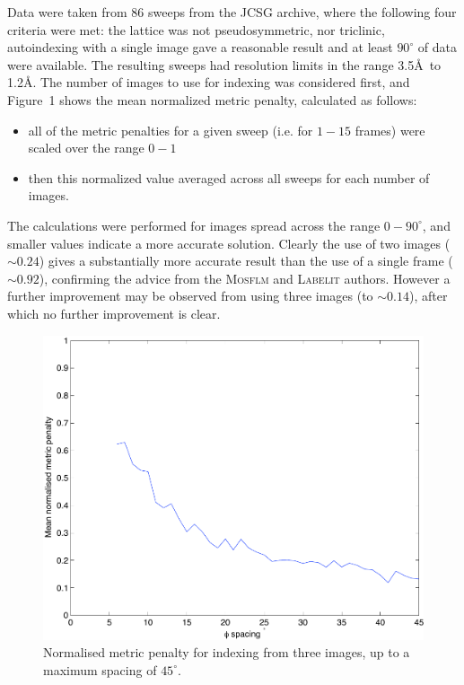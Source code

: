 \documentclass[preprint,pdf]{iucr}
\begin{document}
Data were taken from 86 sweeps from the JCSG archive, where  the
following four
criteria were met: the lattice was not pseudosymmetric, nor triclinic,
autoindexing with a single image gave a reasonable result and
at least $90^{\circ}$ of data were available. The resulting sweeps had 
resolution limits in the range 3.5\AA\ to 1.2\AA. The number of images
to use for indexing was considered first, and Figure~1
shows the mean normalized metric penalty, calculated as follows:

\begin{itemize}
\item{all of the metric penalties for a
  given sweep (i.e. for $1 - 15$ frames) were scaled over the range $0 - 1$}
\item{then this normalized
  value averaged across all sweeps for each number of images.}
\end{itemize}

\noindent
The calculations were performed for
images spread across the range $0 - 90^{\circ}$, and
smaller values indicate a more accurate solution. Clearly the use of
two images ($\sim 0.24$) gives a substantially more accurate result
than the use of a single frame ($\sim 0.92$), 
confirming the advice from the \textsc{Mosflm} and
\textsc{Labelit} authors. However a further improvement may be observed from
using three images (to $\sim 0.14$), after which no further
improvement is clear.  

\begin{figure}
\caption{Normalised metric penalty for indexing from three images, up
  to a maximum spacing of $45^{\circ}$.
\label{figure:phi_spacing_45a}}
\centering
\includegraphics[scale=0.5]{figures/phi_spacing_45a.pdf}
\end{figure}
\end{document}
